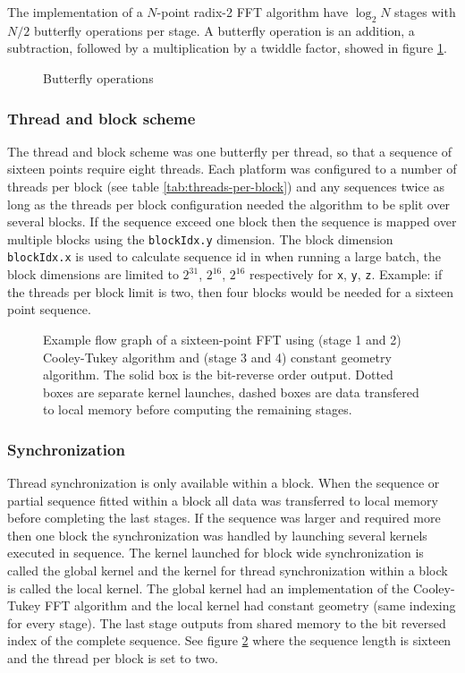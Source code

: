 The implementation of a $N$-point radix-2 FFT algorithm have $\log_2 N$ stages with $N/2$ butterfly operations per stage. A butterfly operation is an addition, a subtraction, followed by a multiplication by a twiddle factor, showed in figure \ref{fig:butterfly}.
\begin{figure}[h]
	\centering
	
	\caption{Butterfly operations}
	\label{fig:butterfly}
\end{figure}

\subsubsection{Thread and block scheme}

The thread and block scheme was one butterfly per thread, so that a sequence of sixteen points require eight threads. Each platform was configured to a number of threads per block (see table \ref{tab:threads-per-block}) and any sequences twice as long as the threads per block configuration needed the algorithm to be split over several blocks. If the sequence exceed one block then the sequence is mapped over multiple blocks using the \texttt{blockIdx.y} dimension. The block dimension \texttt{blockIdx.x} is used to calculate sequence id in when running a large batch, the block dimensions are limited to $2^{31}$, $2^{16}$, $2^{16}$ respectively for \texttt{x}, \texttt{y}, \texttt{z}. Example: if the threads per block limit is two, then four blocks would be needed for a sixteen point sequence.
\begin{figure}
	
	\caption{Example flow graph of a sixteen-point FFT using (stage 1 and 2) Cooley-Tukey algorithm and (stage 3 and 4) constant geometry algorithm. The solid box is the bit-reverse order output. Dotted boxes are separate kernel launches, dashed boxes are data transfered to local memory before computing the remaining stages.}
	\label{fig:flowgraph-16}
\end{figure}

\subsubsection{Synchronization}

Thread synchronization is only available within a block. When the sequence or partial sequence fitted within a block all data was transferred to local memory before completing the last stages. If the sequence was larger and required more then one block the synchronization was handled by launching several kernels executed in sequence. The kernel launched for block wide synchronization is called the global kernel and the kernel for thread synchronization within a block is called the local kernel. The global kernel had an implementation of the Cooley-Tukey FFT algorithm and the local kernel had constant geometry (same indexing for every stage). The last stage outputs from shared memory to the bit reversed index of the complete sequence. See figure \ref{fig:flowgraph-16} where the sequence length is sixteen and the thread per block is set to two.

